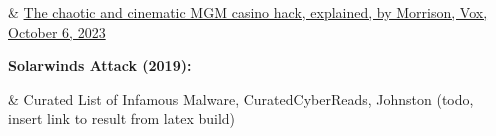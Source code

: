 \documentclass[a4paper]{article}
\begin{document}
 \noindent{}
 \begin{easylist}[itemize]
 & \href{https://www.vox.com/technology/2023/9/15/23875113/mgm-hack-casino-vishing-cybersecurity-ransomware}{The chaotic and cinematic MGM casino hack, explained, by Morrison, Vox, October 6, 2023}
 \end{easylist}

	\noindent\textbf{Solarwinds Attack (2019):}
	\begin{easylist}[itemize]
	& Curated List of Infamous Malware, CuratedCyberReads, Johnston (todo, insert link to result from latex build)
	\end{easylist}

	\bigskip\noindent
\end{document}
